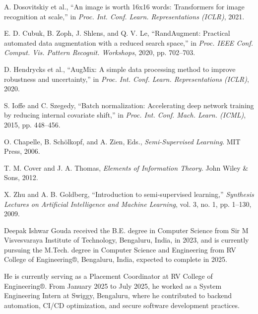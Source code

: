 \documentclass{ieeeaccess}
\begin{document}
\begin{thebibliography}{00}
 A. Dosovitskiy et al., ``An image is worth 16x16 words: Transformers for image recognition at scale,'' in \emph{Proc. Int. Conf. Learn. Representations (ICLR)}, 2021.

 E. D. Cubuk, B. Zoph, J. Shlens, and Q. V. Le, ``RandAugment: Practical automated data augmentation with a reduced search space,'' in \emph{Proc. IEEE Conf. Comput. Vis. Pattern Recognit. Workshops}, 2020, pp. 702--703.

 D. Hendrycks et al., ``AugMix: A simple data processing method to improve robustness and uncertainty,'' in \emph{Proc. Int. Conf. Learn. Representations (ICLR)}, 2020.

 S. Ioffe and C. Szegedy, ``Batch normalization: Accelerating deep network training by reducing internal covariate shift,'' in \emph{Proc. Int. Conf. Mach. Learn. (ICML)}, 2015, pp. 448--456.

 O. Chapelle, B. Schölkopf, and A. Zien, Eds., \emph{Semi-Supervised Learning}. MIT Press, 2006.

 T. M. Cover and J. A. Thomas, \emph{Elements of Information Theory}. John Wiley & Sons, 2012.

 X. Zhu and A. B. Goldberg, ``Introduction to semi-supervised learning,'' \emph{Synthesis Lectures on Artificial Intelligence and Machine Learning}, vol. 3, no. 1, pp. 1--130, 2009.

\end{thebibliography}

\vspace{2.5cm}
\setlength{\parskip}{0pt}
\begin{IEEEbiography}{Deepak Ishwar Gouda} received the B.E. degree in Computer Science from Sir M Visvesvaraya Institute of Technology, Bengaluru, India, in 2023, and is currently pursuing the M.Tech. degree in Computer Science and Engineering from RV College of Engineering®, Bengaluru, India, expected to complete in 2025.

He is currently serving as a Placement Coordinator at RV College of Engineering®. From January 2025 to July 2025, he worked as a System Engineering Intern at Swiggy, Bengaluru, where he contributed to backend automation, CI/CD optimization, and secure software development practices.
\end{IEEEbiography}
\end{document}
